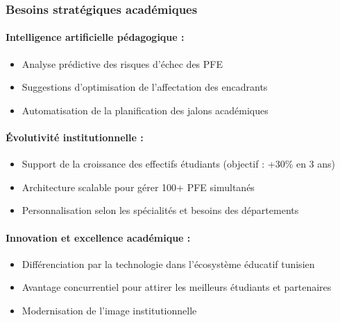 \subsubsection{Besoins stratégiques académiques}

\paragraph{Intelligence artificielle pédagogique :}
\begin{itemize}
    \item Analyse prédictive des risques d'échec des PFE
    \item Suggestions d'optimisation de l'affectation des encadrants
    \item Automatisation de la planification des jalons académiques
\end{itemize}

\paragraph{Évolutivité institutionnelle :}
\begin{itemize}
    \item Support de la croissance des effectifs étudiants (objectif : +30\% en 3 ans)
    \item Architecture scalable pour gérer 100+ PFE simultanés
    \item Personnalisation selon les spécialités et besoins des départements
\end{itemize}

\paragraph{Innovation et excellence académique :}
\begin{itemize}
    \item Différenciation par la technologie dans l'écosystème éducatif tunisien
    \item Avantage concurrentiel pour attirer les meilleurs étudiants et partenaires
    \item Modernisation de l'image institutionnelle
\end{itemize}

